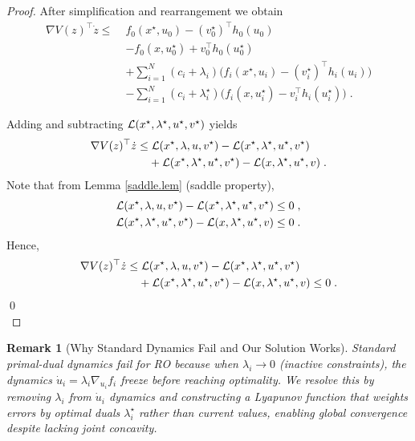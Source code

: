 \documentclass[journal,twoside,web]{ieeecolor}
\newcommand{\rev}[1]{\textcolor{revisionblue}{#1}}
\newtheorem{remark}{Remark}
\begin{document}
\begin{proof}
After simplification and rearrangement we obtain
\begin{align*}
\nabla V(z)^\top \dot z\leq \; & f_0(x^\star,u_0)-(v_0^\star)^\top
h_0(u_0)\\
&-f_0(x,u_0^\star)+v_0^\top h_0(u_0^\star)\\
&+\sum_{i=1}^N(c_i+\lambda_i) \Big(f_i(x^\star,u_i)-(v_i^\star)^\top h_i(u_i)\Big)\\
&-\sum_{i=1}^N(c_i+\lambda_i^\star) \Big(f_i(x,u_i^\star)-v_i^\top h_i(u_i^\star)\Big)\;.
\end{align*}

Adding and subtracting ${\cal L}(x^\star,\lambda^\star,u^\star,v^\star)$ yields
\begin{align} \label{deriv_v}
\nabla V(z)^\top \dot z\leq&\; {\cal L}(x^\star,\lambda,u,v^\star)-{\cal L}(x^\star,\lambda^\star,u^\star,v^\star)\\
&+{\cal L}(x^\star,\lambda^\star,u^\star,v^\star)-{\cal L}(x,\lambda^\star,u^\star,v) \;.\nonumber
\end{align}
Note that from Lemma \ref{saddle.lem} (saddle property),
\begin{align*}{\cal L}(x^\star,\lambda,u,v^\star)-{\cal L}(x^\star,\lambda^\star,u^\star,v^\star)\leq 0\;,
\\
{\cal L}(x^\star,\lambda^\star,u^\star,v^\star)-{\cal L}(x,\lambda^\star,u^\star,v)\leq 0\;.
\end{align*}
Hence,
\begin{align} \label{deriv_v2}
\nabla V(z)^\top \dot z\leq&\; {\cal L}(x^\star,\lambda,u,v^\star)-{\cal L}(x^\star,\lambda^\star,u^\star,v^\star)\\
&+{\cal L}(x^\star,\lambda^\star,u^\star,v^\star)-{\cal L}(x,\lambda^\star,u^\star,v)\leq 0 \;.\nonumber
\end{align}
\qed\\
\end{proof}

\begin{remark}[\rev{Why Standard Dynamics Fail and Our Solution Works}] \label{remark_reader_notice}
\rev{Standard primal-dual dynamics fail for RO because when $\lambda_i \to 0$ (inactive constraints), the dynamics $\dot{u}_i = \lambda_i \nabla_{u_i} f_i$ freeze before reaching optimality. We resolve this by removing $\lambda_i$ from $\dot{u}_i$ dynamics and constructing a Lyapunov function that weights errors by optimal duals $\lambda_i^\star$ rather than current values, enabling global convergence despite lacking joint concavity.}
\end{remark}
\end{document}

